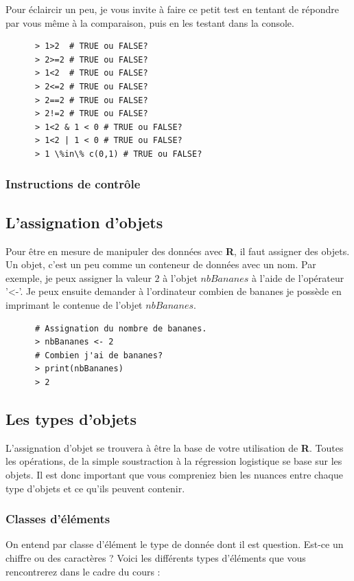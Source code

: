 \documentclass[10.5pt,a4paper]{article}
\begin{document}
    Pour éclaircir un peu, je vous invite à faire ce petit test en tentant de répondre par vous même à la comparaison, puis en les testant dans la console.
    
    \begin{lstlisting}
      > 1>2  # TRUE ou FALSE?
      > 2>=2 # TRUE ou FALSE?
      > 1<2  # TRUE ou FALSE?
      > 2<=2 # TRUE ou FALSE?
      > 2==2 # TRUE ou FALSE?
      > 2!=2 # TRUE ou FALSE?
      > 1<2 & 1 < 0 # TRUE ou FALSE?
      > 1<2 | 1 < 0 # TRUE ou FALSE?
      > 1 \%in\% c(0,1) # TRUE ou FALSE?
      \end{lstlisting}
    
    \subsubsection{Instructions de contrôle}
  
  
  
  
  
  \subsection{L'assignation d'objets}
  Pour être en mesure de manipuler des données avec \textbf{R}, il faut assigner des objets. Un objet, c'est un peu comme un conteneur de données avec un nom. Par exemple, je peux assigner la valeur $2$ à l'objet $nbBananes$ à l'aide de l'opérateur '<-'. Je peux ensuite demander à l'ordinateur combien de bananes je possède en imprimant le contenue de l'objet $nbBananes$.
   
    \begin{lstlisting}
      # Assignation du nombre de bananes.
      > nbBananes <- 2
      # Combien j'ai de bananes?
      > print(nbBananes)
      > 2
    \end{lstlisting}
    
  \subsection{Les types d'objets}
   L'assignation d'objet se trouvera à être la base de votre utilisation de \textbf{R}. Toutes les opérations, de la simple soustraction à la régression logistique se base sur les objets. Il est donc important que vous compreniez bien les nuances entre chaque type d'objets et ce qu'ils peuvent contenir.
   
    \subsubsection{Classes d'éléments}
    On entend par classe d'élément le type de donnée dont il est question. Est-ce un chiffre ou des caractères ? Voici les différents types d'éléments que vous rencontrerez dans le cadre du cours : 
    
\end{document}
